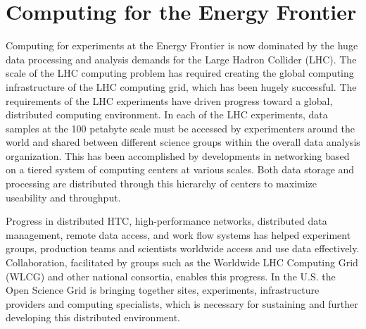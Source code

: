 \section{Computing for the Energy Frontier}

Computing for experiments at the Energy Frontier is now dominated by
the huge data processing and analysis demands for the Large Hadron Collider
(LHC). The scale of the LHC computing problem has required creating the
global computing infrastructure of the LHC computing grid, which has been
hugely successful.  
The requirements of the LHC experiments have driven progress toward a 
global, distributed computing environment.   In each of the LHC experiments, 
data samples at the 100 petabyte scale must be accessed by experimenters around 
the world and shared between different science groups within the overall 
data analysis organization.  This has been accomplished by developments 
in networking based on a tiered system of computing centers at various 
scales. Both data storage and processing are distributed through 
this hierarchy of centers to maximize useability and throughput.

Progress in distributed HTC, high-performance networks, distributed data 
management, remote data access, and work flow systems has helped 
experiment groups, production teams and scientists worldwide access 
and use data effectively. Collaboration, facilitated by groups such as 
the Worldwide LHC Computing Grid (WLCG) and other national consortia, 
enables this progress.
In the U.S.  the Open Science Grid is  bringing together sites, 
experiments, infrastructure
providers and computing specialists, which is necessary for  sustaining and
further developing this distributed environment.

